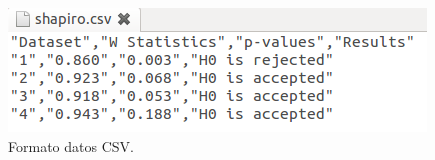 \begin{figure}[H]
\centering
\includegraphics[scale=0.6]{figuras/man_csv.png}
\caption{Formato datos CSV.}
\label{fig:man_csv}
\end{figure}